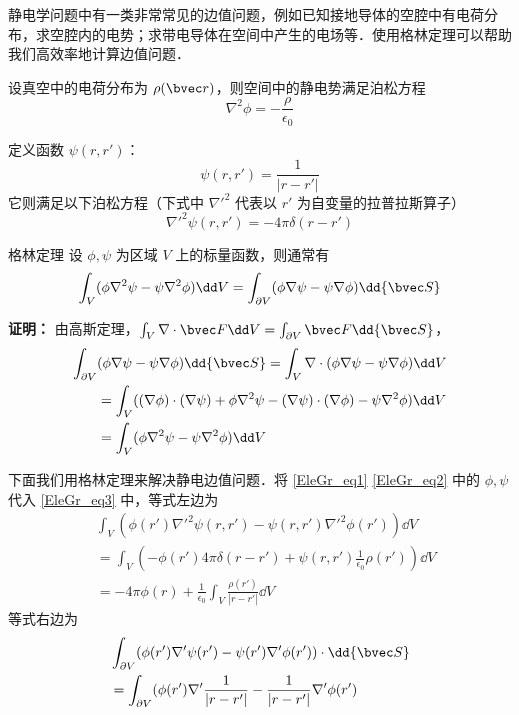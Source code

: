 

静电学问题中有一类非常常见的边值问题，例如已知接地导体的空腔中有电荷分布，求空腔内的电势；求带电导体在空间中产生的电场等．使用格林定理可以帮助我们高效率地计算边值问题．

设真空中的电荷分布为 $\rho(\bvec r)$，则空间中的静电势满足泊松方程
\begin{equation}\label{EleGr_eq1}
\nabla^2 \phi = -\frac{\rho}{\epsilon_0}
\end{equation}

定义函数 $\psi(r,r')$：
\begin{equation}
\psi(r,r')=\frac{1}{|r-r'|}
\end{equation}
它则满足以下泊松方程（下式中 $\nabla'^2$ 代表以 $r'$ 为自变量的拉普拉斯算子）
\begin{equation}\label{EleGr_eq2}
\nabla'^2 \psi(r,r')=-4\pi\delta(r-r')
\end{equation}

\begin{theorem}{格林定理}
设 $\phi,\psi$ 为区域 $V$ 上的标量函数，则通常有
\begin{equation}\label{EleGr_eq3}
\int_V (\phi \nabla^2 \psi -\psi\nabla^2\phi)\dd V=\int_{\partial V}(\phi \nabla \psi-\psi\nabla\phi)\dd {\bvec S} 
\end{equation}
\end{theorem}
\textbf{证明：} 由高斯定理，$\int_V \nabla\cdot \bvec F\dd V=\int_{\partial V}\bvec F \dd {\bvec S}$，
\begin{equation}
\begin{aligned}
\int_{\partial V}&(\phi\nabla\psi-\psi\nabla\phi)\dd{\bvec S}=\int_V \nabla \cdot (\phi\nabla\psi-\psi\nabla\phi)\dd V\\
&=\int_V((\nabla\phi)\cdot(\nabla\psi)+\phi\nabla^2\psi-(\nabla\psi)\cdot(\nabla\phi)-\psi\nabla^2\phi)\dd V\\
&=\int_V(\phi\nabla^2\psi-\psi\nabla^2\phi)\dd V
\end{aligned}
\end{equation}

下面我们用格林定理来解决静电边值问题．将 \autoref{EleGr_eq1} \autoref{EleGr_eq2} 中的 $\phi,\psi$ 代入 \autoref{EleGr_eq3}  中，等式左边为
\begin{equation}
\begin{aligned}
&\int_V(\phi(r')\nabla'^2\psi(r,r')-\psi(r,r')\nabla'^2\phi(r'))\dd V
\\
&=\int_V(-\phi(r')4\pi \delta(r-r')+\psi(r,r')\frac{1}{\epsilon_0}\rho(r'))\dd V\\
&=-4\pi\phi(r)+\frac{1}{\epsilon_0}\int_V\frac{\rho(r')}{|r-r'|}\dd V
\end{aligned}
\end{equation}
等式右边为
\begin{equation}
\begin{aligned}
&\int_{\partial V}(\phi(r')\nabla'\psi(r')-\psi(r')\nabla'\phi(r'))\cdot \dd {\bvec S}\\
&=\int_{\partial V}(\phi(r')\nabla'\frac{1}{|r-r'|}-\frac{1}{|r-r'|}\nabla'\phi(r')
\end{aligned}
\end{equation}
